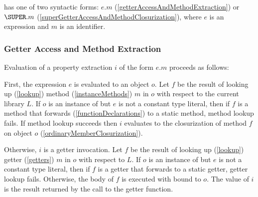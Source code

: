 \documentclass[makeidx]{article}
\begin{document}
\LMHash{}%
has one of two syntactic forms:
$e.m$ (\ref{getterAccessAndMethodExtraction}) or
$\SUPER.m$ (\ref{superGetterAccessAndMethodClosurization}),
where $e$ is an expression and $m$ is an identifier.


\subsubsection{Getter Access and Method Extraction}

\LMHash{}%
Evaluation of a property extraction $i$ of the form $e.m$ proceeds as follows:

\LMHash{}%
First, the expression $e$ is evaluated to an object $o$.
Let $f$ be the result of looking up (\ref{lookup}) method (\ref{instanceMethods}) $m$ in $o$ with respect to the current library $L$.
If $o$ is an instance of  but $e$ is not a constant type literal, then if $f$ is a method that forwards (\ref{functionDeclarations}) to a static method, method lookup fails.
If method lookup succeeds then $i$ evaluates to the closurization of method $f$ on object $o$ (\ref{ordinaryMemberClosurization}).


\LMHash{}%
Otherwise, $i$ is a getter invocation.
Let $f$ be the result of looking up (\ref{lookup}) getter (\ref{getters}) $m$ in $o$ with respect to $L$.
If $o$ is an instance of  but $e$ is not a constant type literal, then if $f$ is a getter that forwards to a static getter, getter lookup fails.
Otherwise, the body of $f$ is executed with \THIS{} bound to $o$.
The value of $i$ is the result returned by the call to the getter function.
\end{document}
